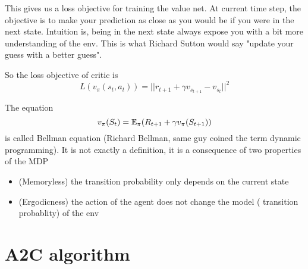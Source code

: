 \documentclass{article}
\begin{document}
This gives us a loss objective for training the value net. At current time
step, the objective is to make your prediction as close as you would be if
you were in the next state. Intuition is, being in the next state always 
expose you with a bit more understanding of the env. This is what Richard Sutton
would say "update your guess with a better guess". 

So the loss objective of critic is
\[
  L(v_{\pi}(s_t, a_t)) = ||r_{t+1} + \gamma v_{s_{t+1}} - v_{s_t}||^2
\]

The equation 
\[
  v_{\pi}(S_t) = \mathbb{E}_{\pi}(R_{t+1} + \gamma v_{\pi}(S_{t+1}))
\]
is called Bellman equation (Richard Bellman, same guy coined the term
dynamic programming). It is not exactly a definition, it is a consequence
of two properties of the MDP
\begin{itemize}
  \item (Memoryless) the transition probability only depends on the current
    state
  \item (Ergodicness) the action of the agent does not change the model (
    transition probablity) of the env
\end{itemize}
\newpage

\section{A2C algorithm}
\end{document}
